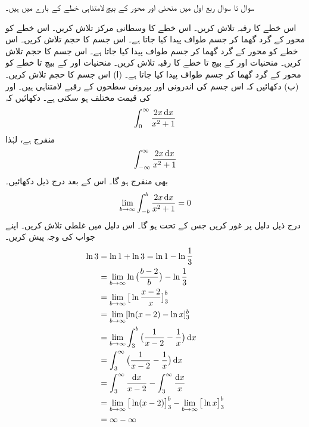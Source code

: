 سوال  تا سوال  ربع اول میں منحنی  اور محور  کے بیچ لامتناہی خطے کے بارے میں ہیں۔

اس خطے کا رقبہ تلاش کریں۔
اس خطے کا وسطانی مرکز تلاش کریں۔
اس خطے کو محور  کے گرد گھما کر جسم طواف پیدا کیا جاتا ہے۔ اس جسم کا حجم تلاش کریں۔
\wf{\unexpanded{
$2\pi$
}}
اس خطے کو محور  کے گرد گھما کر جسم طواف پیدا کیا جاتا ہے۔ اس جسم کا حجم تلاش کریں۔
منحنیات   اور  کے بیچ  تا   خطے کا رقبہ تلاش کریں۔
منحنیات  اور  کے بیچ  تا  خطے کو محور  کے گرد گھما کر جسم طواف پیدا کیا جاتا ہے۔ (ا) اس جسم کا حجم تلاش کریں۔ (ب) دکھائیں کہ اس جسم کی  اندرونی اور بیرونی سطحوں کے رقبے لامتناہی ہیں۔
 اور  کی قیمت مختلف ہو سکتی ہے۔ دکھائیں کہ
\begin{align*}
\int_0^{\infty}\frac{2x\dif x}{x^2+1}
\end{align*}
منفرج ہے،  لہٰذا
\begin{align*}
\int_{-\infty}^{\infty}\frac{2x\dif x}{x^2+1}
\end{align*}
بھی منفرج ہو گا۔ اس کے بعد درج ذیل دکھائیں۔
\begin{align*}
\lim_{b\to \infty}\int_{-b}^b\frac{2x\dif x}{x^2+1}=0
\end{align*}
درج ذیل دلیل پر غور کریں جس کے تحت   ہو گا۔ اس دلیل میں غلطی تلاش کریں۔ اپنے جواب کی وجہ پیش کریں۔
\begin{align*}
\ln 3&=\ln 1+\ln 3=\ln 1-\ln \frac{1}{3}\\
&=\lim_{b\to \infty}\ln\big(\frac{b-2}{b}\big)-\ln\frac{1}{3}\\
&=\lim_{b\to \infty}\big[\ln \frac{x-2}{x}\big]_3^b\\
&=\lim_{b\to \infty}[\ln(x-2)-\ln x]_3^b\\
&=\lim_{b\to \infty}\int_3^b\big(\frac{1}{x-2}-\frac{1}{x}\big)\dif x\\
&=\int_3^{\infty}\big(\frac{1}{x-2}-\frac{1}{x}\big)\dif x\\
&=\int_3^{\infty}\frac{\dif x}{x-2}-\int_3^{\infty}\frac{\dif x}{x}\\
&=\lim_{b\to \infty}\big[\ln(x-2)\big]_3^b-\lim_{b\to\infty}\big[\ln x\big]_3^b\\
&=\infty-\infty
\end{align*}  
